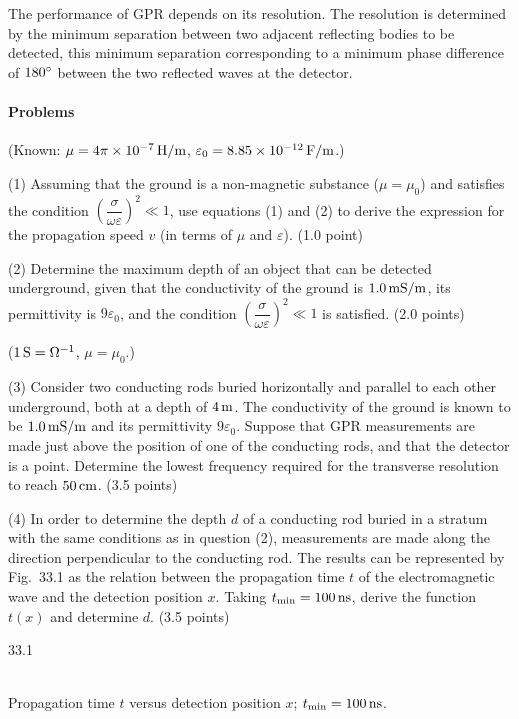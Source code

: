 The performance of GPR depends on its resolution. The resolution is determined by the minimum separation between two adjacent reflecting bodies to be detected, this minimum separation corresponding to a minimum phase difference of $180^{\circ}$ between the two reflected waves at the detector.

\paragraph{Problems}

(Known: $\mu=4\pi\times10^{-7}\,\mathrm{H/m}$, $\varepsilon_0=8.85\times10^{-12}\,\mathrm{F/m}$.)

(1) Assuming that the ground is a non-magnetic substance ($\mu=\mu_0$) and satisfies the condition $\left(\dfrac{\sigma}{\omega\varepsilon}\right)^2\ll1$, use equations (1) and (2) to derive the expression for the propagation speed $v$ (in terms of $\mu$ and $\varepsilon$). (1.0 point)

(2) Determine the maximum depth of an object that can be detected underground, given that the conductivity of the ground is $1.0\,\mathrm{mS/m}$, its permittivity is $9\varepsilon_0$, and the condition $\left(\dfrac{\sigma}{\omega\varepsilon}\right)^2\ll1$ is satisfied. (2.0 points)

($1\,\mathrm{S}=\Omega^{-1}$, $\mu=\mu_0$.)

(3) Consider two conducting rods buried horizontally and parallel to each other underground, both at a depth of $4\,\mathrm{m}$. The conductivity of the ground is known to be $1.0\,\mathrm{mS/m}$ and its permittivity $9\varepsilon_0$. Suppose that GPR measurements are made just above the position of one of the conducting rods, and that the detector is a point. Determine the lowest frequency required for the transverse resolution to reach $50\,\mathrm{cm}$. (3.5 points)

(4) In order to determine the depth $d$ of a conducting rod buried in a stratum with the same conditions as in question (2), measurements are made along the direction perpendicular to the conducting rod. The results can be represented by Fig.~33.1 as the relation between the propagation time $t$ of the electromagnetic wave and the detection position $x$. Taking $t_{\min}=100\,\mathrm{ns}$, derive the function $t(x)$ and determine $d$. (3.5 points)

\begin{figbox}{33.1}
\\[2pt]{\small Propagation time $t$ versus detection position $x$; $t_{\min}=100\,\mathrm{ns}$.}
\end{figbox}


